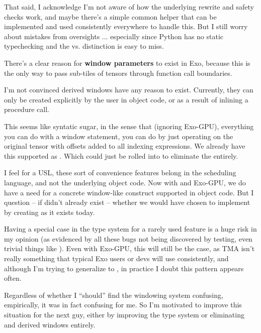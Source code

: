 \filbreak
That said, I acknowledge I'm not aware of how the underlying rewrite and safety checks work, and maybe there's a simple common helper that can be implemented and used consistently everywhere to handle this.
But I still worry about mistakes from oversights ... especially since Python has no static typechecking and the  vs.  distinction is easy to miss.

\filbreak
{} There's a clear reason for \textbf{window parameters} to exist in Exo, because this is the only way to pass sub-tiles of tensors through function call boundaries.

\filbreak
I'm not convinced derived windows have any reason to exist.
Currently, they can only be created explicitly by the user in object code, or as a result of inlining a procedure call.

\filbreak
This seems like syntatic sugar, in the sense that (ignoring Exo-GPU), everything you can do with a window statement, you can do by just operating on the original tensor with offsets added to all indexing expressions.
We already have this supported as .
Which could just be rolled into  to eliminate the  entirely.

\filbreak
I feel for a USL, these sort of convenience features belong in the scheduling language, and not the underlying object code.
Now with  and Exo-GPU, we do have a need for a concrete window-like construct supported in object code.
But I question -- if  didn't already exist -- whether we would have chosen to implement  by creating  as it exists today.

\filbreak
{} Having a special case in the type system for a rarely used feature is a huge risk in my opinion (as evidenced by all these bugs not being discovered by testing, even trivial things like ).
Even with Exo-GPU, this will still be the case, as TMA isn't really something that typical Exo users or devs will use consistently, and although I'm trying to generalize  to , in practice I doubt this pattern appears often.

\filbreak
Regardless of whether I ``should'' find the windowing system confusing, empirically, it was in fact confusing for me.
So I'm motivated to improve this situation for the next guy, either by improving the type system or eliminating  and derived windows entirely.

